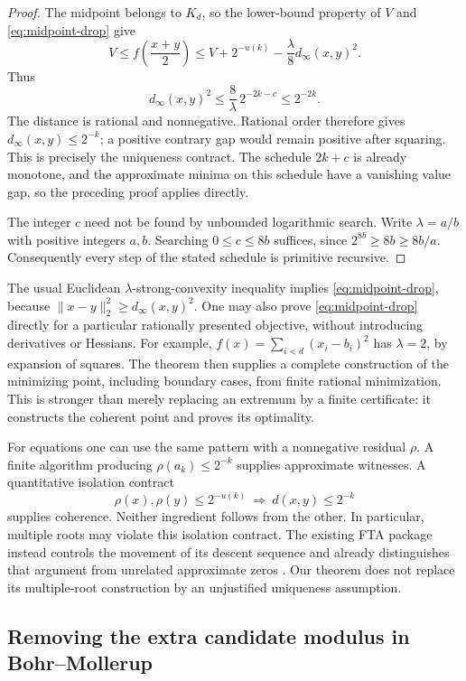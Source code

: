 \begin{proof}
The midpoint belongs to $K_d$, so the lower-bound property of $V$
and \eqref{eq:midpoint-drop} give
\[
 V\le f\!\left(\frac{x+y}{2}\right)
   \le V+2^{-u(k)}
                 -\frac{\lambda}{8}d_\infty(x,y)^2.
\]
Thus
\[
 d_\infty(x,y)^2
 \le\frac8\lambda\,2^{-2k-c}\le2^{-2k}.
\]
The distance is rational and nonnegative.  Rational order therefore
gives $d_\infty(x,y)\le2^{-k}$; a positive contrary gap would remain
positive after squaring.  This is precisely the uniqueness contract.
The schedule $2k+c$ is already monotone, and the approximate minima
on this schedule have a vanishing value gap, so the preceding proof
applies directly.

The integer $c$ need not be found by unbounded logarithmic search.
Write $\lambda=a/b$ with positive integers $a,b$.  Searching
$0\le c\le8b$ suffices, since $2^{8b}\ge8b\ge8b/a$.
Consequently every step of the stated schedule is primitive recursive.
\end{proof}

The usual Euclidean $\lambda$-strong-convexity inequality implies
\eqref{eq:midpoint-drop}, because
$\|x-y\|_2^2\ge d_\infty(x,y)^2$.  One may also prove
\eqref{eq:midpoint-drop} directly for a particular rationally presented
objective, without introducing derivatives or Hessians.  For example,
$f(x)=\sum_{i<d}(x_i-b_i)^2$ has $\lambda=2$, by expansion of squares.
The theorem then supplies a complete construction of the minimizing
point, including boundary cases, from finite rational minimization.
This is stronger than merely replacing an extremum by a finite
certificate: it constructs the coherent point and proves its optimality.

For equations one can use the same pattern with a nonnegative residual
$\rho$.  A finite algorithm producing $\rho(a_k)\le2^{-k}$ supplies
approximate witnesses.  A quantitative isolation contract
\[
 \rho(x),\rho(y)\le2^{-u(k)}
 \ \Longrightarrow\ d(x,y)\le2^{-k}
\]
supplies coherence.  Neither ingredient follows from the other.  In
particular, multiple roots may violate this isolation contract.  The
existing FTA package instead controls the movement of its descent
sequence and already distinguishes that argument from unrelated
approximate zeros \cite{repo-fta}.  Our theorem does not replace its
multiple-root construction by an unjustified uniqueness assumption.

\subsection{Removing the extra candidate modulus in Bohr--Mollerup}
\label{sec:bm-modulus-repair}


